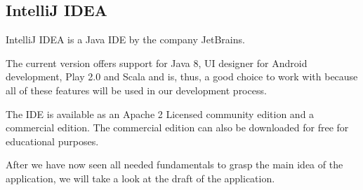\subsection{IntelliJ IDEA}
IntelliJ IDEA is a Java \ac{IDE} by the company JetBrains. 

The current version offers support for Java 8, UI designer for Android development, Play 2.0 and Scala and is, thus, a good choice to work with because all of these features will be used in our development process.

The \ac{IDE} is available as an Apache 2 Licensed community edition and a commercial edition. The commercial edition can also be downloaded for free for educational purposes.

After we have now seen all needed fundamentals to grasp the main idea of the application, we will take a look at the draft of the application.
